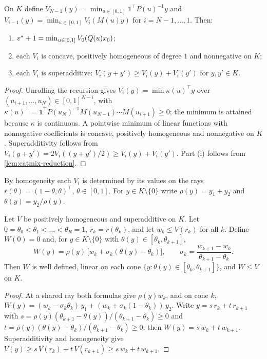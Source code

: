 \begin{lemma}\label{lem:catmix-value}
On $K$ define $V_{N-1}(y) = \min_{u\in[0,1]} \mathbb{1}^\top P(u)^{-1}y$ and $V_{i-1}(y) = \min_{u\in[0,1]} V_i(M(u)y)$ for $i = N-1, \dots, 1$.
Then:
\begin{enumerate}
\item[(i)] $v^{*} + 1 = \min_{u\in[0,1]} V_0(Q(u)x_0)$;
\item[(ii)] each $V_i$ is concave, positively homogeneous of degree $1$ and nonnegative on $K$;
\item[(iii)] each $V_i$ is superadditive: $V_i(y + y') \ge V_i(y) + V_i(y')$ for $y, y' \in K$.
\end{enumerate}
\end{lemma}

\begin{proof}
Unrolling the recursion gives $V_i(y) = \min \kappa(u)^\top y$ over $(u_{i+1},\dots,u_N) \in [0,1]^{N-i}$, with $\kappa(u)^\top = \mathbb{1}^\top P(u_N)^{-1}M(u_{N-1})\cdots M(u_{i+1}) \ge 0$; the minimum is attained because $\kappa$ is continuous.
A pointwise minimum of linear functions with nonnegative coefficients is concave, positively homogeneous and nonnegative on $K$.
Superadditivity follows from $V_i(y + y') = 2V_i((y+y')/2) \ge V_i(y) + V_i(y')$.
Part (i) follows from \cref{lem:catmix-reduction}.
\end{proof}

By homogeneity each $V_i$ is determined by its values on the rays $r(\theta) = (1-\theta, \theta)^\top$, $\theta \in [0,1]$.
For $y \in K\setminus\{0\}$ write $\rho(y) = y_1 + y_2$ and $\theta(y) = y_2/\rho(y)$.

\begin{lemma}\label{lem:catmix-chord}
Let $V$ be positively homogeneous and superadditive on $K$.
Let $0 = \theta_0 < \theta_1 < \dots < \theta_R = 1$, $r_k = r(\theta_k)$, and let $w_k \le V(r_k)$ for all $k$.
Define $W(0) = 0$ and, for $y \in K\setminus\{0\}$ with $\theta(y) \in [\theta_k, \theta_{k+1}]$,
\[
W(y) = \rho(y)\,\bigl[w_k + \sigma_k(\theta(y) - \theta_k)\bigr],\qquad \sigma_k = \frac{w_{k+1} - w_k}{\theta_{k+1} - \theta_k}.
\]
Then $W$ is well defined, linear on each cone $\{y : \theta(y) \in [\theta_k, \theta_{k+1}]\}$, and $W \le V$ on $K$.
\end{lemma}

\begin{proof}
At a shared ray both formulas give $\rho(y)w_k$, and on cone $k$, $W(y) = (w_k - \sigma_k\theta_k)\,y_1 + (w_k + \sigma_k(1 - \theta_k))\,y_2$.
Write $y = s\,r_k + t\,r_{k+1}$ with $s = \rho(y)(\theta_{k+1} - \theta(y))/(\theta_{k+1} - \theta_k) \ge 0$ and $t = \rho(y)(\theta(y) - \theta_k)/(\theta_{k+1} - \theta_k) \ge 0$; then $W(y) = s\,w_k + t\,w_{k+1}$.
Superadditivity and homogeneity give $V(y) \ge s\,V(r_k) + t\,V(r_{k+1}) \ge s\,w_k + t\,w_{k+1}$.
\end{proof}

